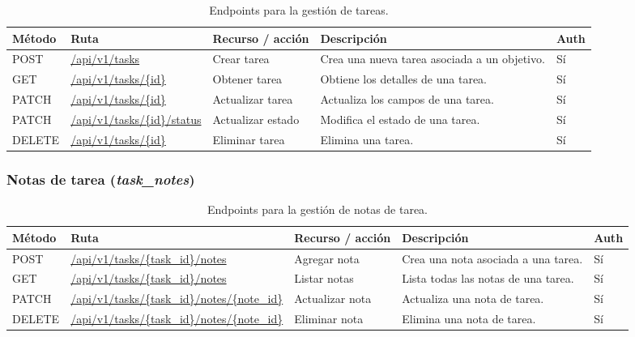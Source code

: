 \begin{table}[H]
\centering
\footnotesize
\setlength{\tabcolsep}{4pt}
\renewcommand{\arraystretch}{1.25}
\begin{tabular}{|p{1.4cm}|p{4.1cm}|p{3.2cm}|p{5.8cm}|p{1cm}|}
\hline
\textbf{Método} & \textbf{Ruta} & \textbf{Recurso / acción} & \textbf{Descripción} & \textbf{Auth} \\
\hline

POST & \url{/api/v1/tasks} & Crear tarea &
Crea una nueva tarea asociada a un objetivo. &
Sí \\
\hline

GET & \url{/api/v1/tasks/{id}} & Obtener tarea &
Obtiene los detalles de una tarea. &
Sí \\
\hline

PATCH & \url{/api/v1/tasks/{id}} & Actualizar tarea &
Actualiza los campos de una tarea. &
Sí \\
\hline

PATCH & \url{/api/v1/tasks/{id}/status} & Actualizar estado &
Modifica el estado de una tarea. &
Sí \\
\hline

DELETE & \url{/api/v1/tasks/{id}} & Eliminar tarea &
Elimina una tarea. &
Sí \\
\hline

\end{tabular}
\caption{Endpoints para la gestión de tareas.}
\end{table}

\subsubsection*{Notas de tarea (\textit{task\_notes})}

\begin{table}[H]
\centering
\footnotesize
\setlength{\tabcolsep}{4pt}
\renewcommand{\arraystretch}{1.25}
\begin{tabular}{|p{1.4cm}|p{4.1cm}|p{3.2cm}|p{5.8cm}|p{1cm}|}
\hline
\textbf{Método} & \textbf{Ruta} & \textbf{Recurso / acción} & \textbf{Descripción} & \textbf{Auth} \\
\hline

POST & \url{/api/v1/tasks/{task\_id}/notes} & Agregar nota &
Crea una nota asociada a una tarea. &
Sí \\
\hline

GET & \url{/api/v1/tasks/{task\_id}/notes} & Listar notas &
Lista todas las notas de una tarea. &
Sí \\
\hline

PATCH & \url{/api/v1/tasks/{task\_id}/notes/{note\_id}} & Actualizar nota &
Actualiza una nota de tarea. &
Sí \\
\hline

DELETE & \url{/api/v1/tasks/{task\_id}/notes/{note\_id}} & Eliminar nota &
Elimina una nota de tarea. &
Sí \\
\hline

\end{tabular}
\caption{Endpoints para la gestión de notas de tarea.}
\end{table}

